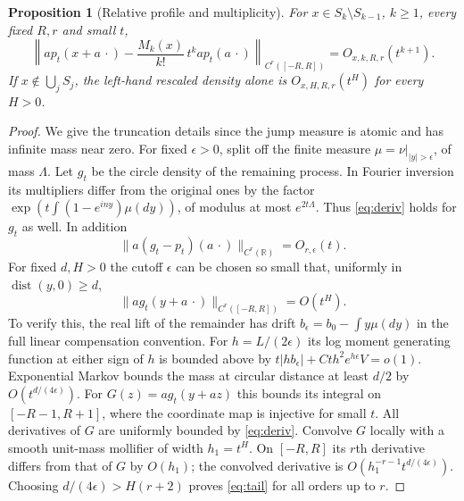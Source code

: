 \documentclass[11pt]{article}
\newtheorem{proposition}[theorem]{Proposition}
\theoremstyle{remark}\newtheorem{remark}[theorem]{Remark}
\newcommand{\R}{\mathbb R}\newcommand{\T}{\mathbb T}\newcommand{\Z}{\mathbb Z}\newcommand{\N}{\mathbb N}
\DeclareMathOperator{\dist}{dist}
\begin{document}
\begin{proposition}[Relative profile and multiplicity]\label{prop:profile}
For $x\in S_k\setminus S_{k-1}$, $k\ge1$, every fixed $R,r$ and small $t$,
\begin{equation}\label{eq:relative}
 \left\|a p_t(x+a\,\cdot)-
  \frac{M_k(x)}{k!}\,t^k a p_t(a\,\cdot)\right\|_{C^r([-R,R])}
     =O_{x,k,R,r}(t^{k+1}).
\end{equation}
If $x\notin\bigcup_j S_j$, the left-hand rescaled density alone
is $O_{x,H,R,r}(t^H)$ for every $H>0$.
\end{proposition}
\begin{proof}
We give the truncation details since the jump measure is atomic and has
infinite mass near zero. For fixed $\epsilon>0$, split off the finite
measure $\mu=\nu|_{|y|>\epsilon}$, of mass $\Lambda$. Let $g_t$ be the
circle density of the remaining process. In Fourier inversion its
multipliers differ from the original ones by the factor
$\exp(t\int(1-e^{iny})\mu(dy))$, of modulus at most $e^{2t\Lambda}$.
Thus \eqref{eq:deriv} holds for $g_t$ as well. In addition
\begin{equation}\label{eq:finite-removal}
 \|a(g_t-p_t)(a\,\cdot)\|_{C^r(\R)}=O_{r,\epsilon}(t).
\end{equation}
For fixed $d,H>0$ the cutoff $\epsilon$ can be chosen so small that,
uniformly in $\dist(y,0)\ge d$,
\begin{equation}\label{eq:tail}
 \|a g_t(y+a\,\cdot)\|_{C^r([-R,R])}=O(t^H).
\end{equation}
To verify this, the real lift of the remainder has drift
$b_\epsilon=b_0-\int y\mu(dy)$ in the full linear compensation convention.
For $h=L/(2\epsilon)$ its log moment generating function at either sign
of $h$ is bounded above by
$t|h b_\epsilon|+C t h^2 e^{h\epsilon}V=o(1)$.
Exponential Markov bounds the mass at circular distance at least $d/2$
by $O(t^{d/(4\epsilon)})$. For $G(z)=a g_t(y+az)$ this bounds its
integral on $[-R-1,R+1]$, where the coordinate map is injective for small
$t$. All derivatives of $G$ are uniformly bounded by \eqref{eq:deriv}.
Convolve $G$ locally with a smooth unit-mass mollifier of width $h_1=t^H$.
On $[-R,R]$ its $r$th derivative differs from that of $G$ by $O(h_1)$;
the convolved derivative is
$O(h_1^{-r-1}t^{d/(4\epsilon)})$. Choosing $d/(4\epsilon)>H(r+2)$
proves \eqref{eq:tail} for all orders up to $r$.


\end{proof}
\end{document}
